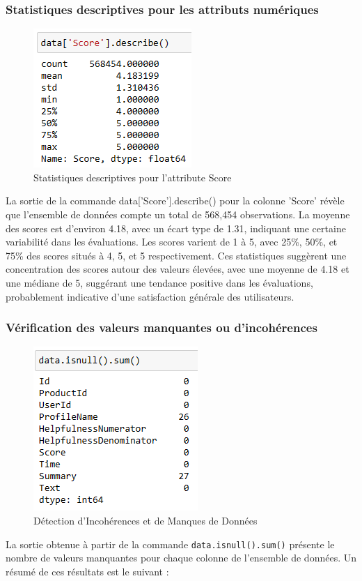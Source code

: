 \subsubsection{Statistiques descriptives pour les attributs numériques}
\begin{figure}[h]
    \centering
    \includegraphics[scale=1]{assets/describe.PNG}
    \caption{Statistiques descriptives pour l'attribute Score}
    \label{fig:describe}
\end{figure}
\newpage
La sortie de la commande data['Score'].describe() pour la colonne 'Score' révèle que l'ensemble de données compte un total de 568,454 observations. La moyenne des scores est d'environ 4.18, avec un écart type de 1.31, indiquant une certaine variabilité dans les évaluations. Les scores varient de 1 à 5, avec 25\%, 50\%, et 75\% des scores situés à 4, 5, et 5 respectivement. Ces statistiques suggèrent une concentration des scores autour des valeurs élevées, avec une moyenne de 4.18 et une médiane de 5, suggérant une tendance positive dans les évaluations, probablement indicative d'une satisfaction générale des utilisateurs.

\subsubsection{Vérification des valeurs manquantes ou d'incohérences}
\begin{figure}[h]
    \centering
    \includegraphics[scale=1]{assets/isnull.PNG}
    \caption{Détection d'Incohérences et de Manques de Données}
    \label{fig:isnull}
\end{figure}
La sortie obtenue à partir de la commande \texttt{data.isnull().sum()} présente le nombre de valeurs manquantes pour chaque colonne de l'ensemble de données. Un résumé de ces résultats est le suivant :

